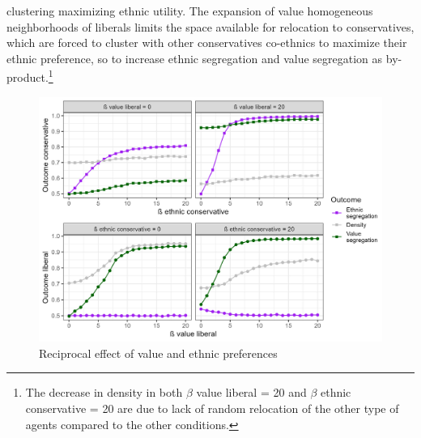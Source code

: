\documentclass[
]{article}
\begin{document}
clustering maximizing ethnic utility. The expansion of value homogeneous neighborhoods of liberals limits the space available for relocation to conservatives, which are forced to cluster with other conservatives co-ethnics to maximize their ethnic preference, so to increase ethnic segregation and value segregation as by-product.\footnote{The decrease in density in both $\beta$ value liberal = 20 and $\beta$ ethnic conservative = 20 are due to lack of random relocation of the other type of agents compared to the other conditions.}


 
 \hfill \newline
 

\begin{figure}[H]
    \centering
    \includegraphics{images/totsens2.jpg}
    \caption{Reciprocal effect of value and ethnic preferences}
    \label{fig:totsens}
\end{figure}
\end{document}

